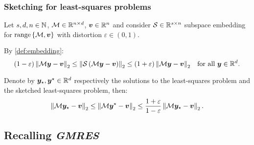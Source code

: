 \begin{frame}
    \frametitle{Sketching for least-squares problems}

    \begin{Fact} \label{fact:least_squares}
        Let $s, d, n \in \mathbb{N}$, $\mathcal{M} \in \mathbb{R}^{n \times d}$, $\bm{v} \in \mathbb{R}^{n}$ and consider $\mathcal{S} \in \mathbb{R}^{s \times n}$ subspace embedding for $\operatorname*{range}\left\{\mathcal{M}, \bm{v}\right\}$ with distortion $\varepsilon \in \left(0, 1\right)$. 
        
        By \cref{def:embedding}:
        \begin{align}
            \left( 1 - \varepsilon \right) \left\lVert \mathcal{M} \bm{y} - \bm{v} \right\rVert_2 \leq \left\lVert \mathcal{S} \left( \mathcal{M} \bm{y} - \bm{v} \right) \right\rVert_2 &\leq \left( 1 + \varepsilon \right) \left\lVert \mathcal{M} \bm{y} - \bm{v} \right\rVert_2 &\text{for all } \bm{y} \in \mathbb{R}^{d}. \label{eq:sketched_least_squares_1}
        \end{align}

        Denote by $\bm{y}_{\star}, \bm{y}^{\star} \in \mathbb{R}^{d}$ respectively the solutions to the least-squares problem and the sketched least-squares problem, then:
        \begin{align}
            \left\lVert \mathcal{M} \bm{y}_{\star} - \bm{v} \right\rVert_2 \leq \left\lVert \mathcal{M} \bm{y}^{\star} - \bm{v} \right\rVert_2 \leq \frac{1 + \varepsilon}{1 - \varepsilon} \left\lVert \mathcal{M} \bm{y}_{\star} - \bm{v} \right\rVert_2. \label{eq:sketched_least_squares_2}
        \end{align}
    \end{Fact}
\end{frame}

\subsection{Recalling \textit{GMRES}}

